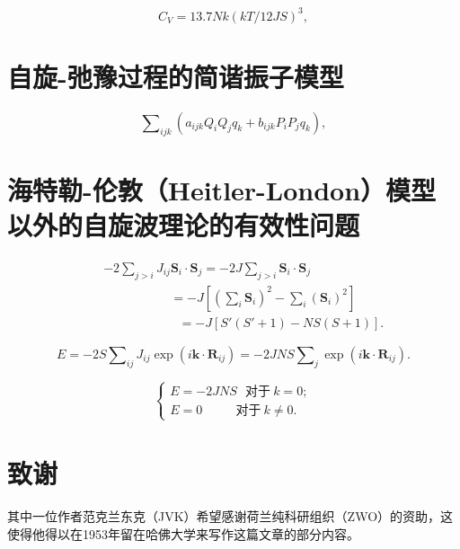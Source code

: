 \documentclass{article}
\begin{document}
\begin{equation} \label{eq:126}
C_V=13.7Nk(kT/12JS)^3,
\end{equation}



\section{自旋-弛豫过程的简谐振子模型} \label{sec:10}


\begin{equation} \label{eq:127}
\sum\nolimits_{\mathit{ijk}}(a_\mathit{ijk}Q_iQ_jq_k+b_\mathit{ijk}P_iP_jq_k),
\end{equation}



\section{海特勒-伦敦（Heitler-London）模型以外的自旋波理论的有效性问题} \label{sec:11}


\begin{eqnarray} \label{eq:128}
&&-2\sum\nolimits_{j>i}J_{ij}\mathbf{S}_i\cdot\mathbf{S}_j=-2J\sum\nolimits_{j>i}\mathbf{S}_i\cdot\mathbf{S}_j\nonumber\\
&&~~~~~~~~~~~~~~~~~~~~~~~~=-J[(\sum\nolimits_i\mathbf{S}_i)^2-\sum\nolimits_i(\mathbf{S}_i)^2]\nonumber\\
&&~~~~~~~~~~~~~~~~~~~~~~~~~~~=-J[S'(S'+1)-NS(S+1)].
\end{eqnarray}

\begin{equation*} 
E=-2S\sum\nolimits_\mathit{ij}J_\mathit{ij}\exp(i\mathbf{k}\cdot\mathbf{R}_\mathit{ij})=-2JNS\sum\nolimits_j\exp(i\mathbf{k}\cdot\mathbf{R}_\mathit{ij}).
\end{equation*}

\begin{equation} \label{eq:129}
\left\{
\begin{array}{l}
E=-2JNS~~~\text{对于}~k=0;\\
E=0~~~~~~~~~~~~\text{对于}~k\neq 0.
\end{array}
\right.
\end{equation}

\section*{致谢}
其中一位作者范克兰东克（JVK）希望感谢荷兰纯科研组织（ZWO）的资助，这使得他得以在1953年留在哈佛大学来写作这篇文章的部分内容。
\end{document}
